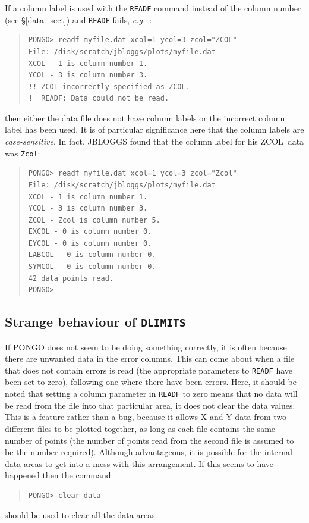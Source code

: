 \documentclass[twoside,11pt]{article}
\newcommand{\htmlref}[2]{#1}
\renewcommand{\_}{\texttt{\symbol{95}}}
\newcommand{\eg}{{\em e.g.\ }}
\newcommand{\zcol}{{\sf ZCOL}}
\newcommand{\pnam}[1]{{\tt #1}}
\newcommand{\cnam}[1]{{\tt #1}}
\newcommand{\iref} [1]{\htmlref{#1}{#1}}
\begin{document}
If a column label is used with the \cnam{\iref{READF}} command instead
of the column number (see \S\ref{data_sect}) and \cnam{\iref{READF}}
fails, \eg:
\begin{quote}
\begin{verbatim}
PONGO> readf myfile.dat xcol=1 ycol=3 zcol="ZCOL"
File: /disk/scratch/jbloggs/plots/myfile.dat
XCOL - 1 is column number 1.
YCOL - 3 is column number 3.
!! ZCOL incorrectly specified as ZCOL.
!  READF: Data could not be read.
\end{verbatim}
\end{quote}
then either the data file does not have column labels or the incorrect
column label has been used.
It is of particular significance here that the column labels are {\em
case-sensitive}.
In fact, JBLOGGS found that the column label for his \zcol\ data was
\pnam{Zcol}:
\begin{quote}
\begin{verbatim}
PONGO> readf myfile.dat xcol=1 ycol=3 zcol="Zcol"
File: /disk/scratch/jbloggs/plots/myfile.dat
XCOL - 1 is column number 1.
YCOL - 3 is column number 3.
ZCOL - Zcol is column number 5.
EXCOL - 0 is column number 0.
EYCOL - 0 is column number 0.
LABCOL - 0 is column number 0.
SYMCOL - 0 is column number 0.
42 data points read.
PONGO>
\end{verbatim}
\end{quote}


\subsection{Strange behaviour of \cnam{DLIMITS}}

If PONGO does not seem to be doing something correctly, it is often
because there are unwanted data in the error columns.  This can come
about when a file that does not contain errors is read (the
appropriate parameters to \cnam{\iref{READF}} have been set to zero),
following one where there have been errors.
Here, it should be noted that setting a column parameter in
\cnam{\iref{READF}} to zero means that no data will be read from the
file into that particular area, it does not clear the data values.
This is a feature rather than a bug, because it allows X and Y data from two
different files to be plotted together, as long as each file contains the same
number of points (the number of points read from the second file is
assumed to be the number required).
Although advantageous, it is possible for the internal data areas to get into a
mess with this arrangement.
If this seems to have happened then the command:
\begin{quote}
\begin{verbatim}
PONGO> clear data
\end{verbatim}
\end{quote}
should be used to clear all the data areas.
\end{document}
